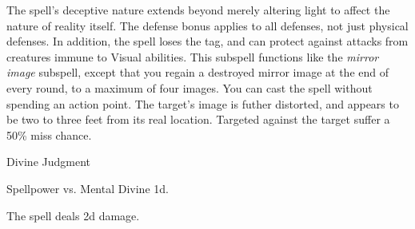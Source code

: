 The spell's deceptive nature extends beyond merely altering light to affect the nature of reality itself.
The defense bonus applies to all defenses, not just physical defenses.
In addition, the spell loses the  tag, and can protect against attacks from creatures immune to Visual abilities.
This subspell functions like the \textit{mirror image} subspell, except that you regain a destroyed mirror image at the end of every round, to a maximum of four images.
You can cast the spell without spending an action point.
The target's image is futher distorted, and appears to be two to three feet from its real location.
Targeted  against the target suffer a 50\% miss chance.
\begin{spellsection}{Divine Judgment}
\begin{spellheader}
\end{spellheader}
\begin{spellcontent}
\begin{spelltargetinginfo}
\end{spelltargetinginfo}
\begin{spelleffects}
\begin{spellattack}{Spellpower vs. Mental}
\spellsuccess Divine  \plus1d.
\end{spellattack}
\end{spelleffects}
\end{spellcontent}
\begin{spellfooter}
\end{spellfooter}
\begin{spellsubcontent}
\begin{spellcantrip}
The spell deals \minus2d damage.
\end{spellcantrip}
\end{spellsubcontent}
\end{spellsection}
